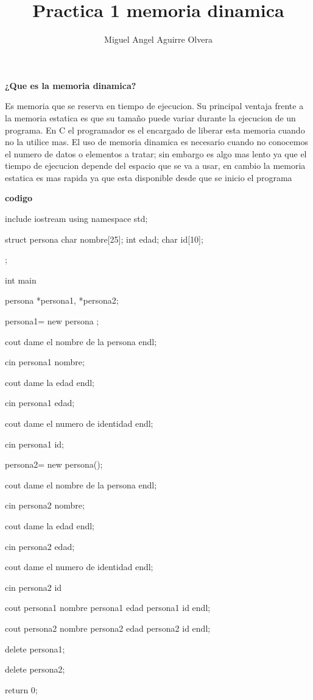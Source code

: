 \documentclass[10pt,a4paper]{article}
\author{Miguel Angel Aguirre Olvera}
\title{Practica 1 memoria dinamica}
\begin{document}
\maketitle
\begin{multicols}{2}
\begin{center}
\textbf{¿Que es la memoria dinamica?}
\end{center}
Es memoria que se reserva en tiempo de ejecucion. Su principal ventaja frente a la memoria estatica es que su tamaño puede variar durante la ejecucion de un programa. En C el programador es el encargado de liberar esta memoria cuando no la utilice mas. El uso de memoria dinamica es necesario cuando no conocemos el numero de datos o elementos a tratar; sin embargo es algo mas lento ya que el tiempo de ejecucion depende del espacio que se va a usar, en cambio la memoria estatica es mas rapida ya que esta disponible desde que se inicio el programa 

\begin{center}
\textbf{codigo}
\end{center}
  include iostream
 	using namespace std;
 	
	struct persona
		char nombre[25];
		int edad;
		char id[10];
	
	;

 	int main
 	 
 	persona *persona1, *persona2;

 	persona1= new persona ;

 	cout dame el nombre de la persona endl;

 	cin persona1 nombre;

 	cout dame la edad endl;

 	cin persona1 edad;

 	cout dame el numero de identidad endl;

 	cin persona1 id;

	 	persona2= new persona();

 	cout dame el nombre de la persona endl;

 	cin persona2 nombre;

 	cout dame la edad endl;

 	cin persona2 edad;

 	cout dame el numero de identidad endl;

 	cin persona2 id
 	

 	cout persona1 nombre persona1 edad persona1 id endl;

 	

 	cout persona2 nombre persona2 edad persona2 id endl;

 	

	delete persona1;


	delete persona2;
 	
 	
 	
 	return 0;

\end{multicols}
\end{document}
